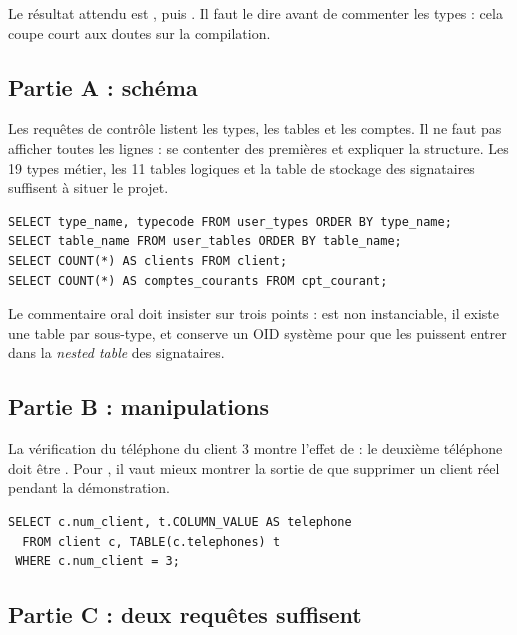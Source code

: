 Le résultat attendu est , puis . Il faut le dire avant
de commenter les types : cela coupe court aux doutes sur la compilation.

\subsection{Partie A : schéma}

Les requêtes de contrôle listent les types, les tables et les comptes. Il ne
faut pas afficher toutes les lignes : se contenter des premières et expliquer
la structure. Les 19 types métier, les 11 tables logiques et la table de
stockage des signataires suffisent à situer le projet.

\begin{lstlisting}[caption={Contrôle du schéma en démonstration.},label={lst:demo-schema}]
SELECT type_name, typecode FROM user_types ORDER BY type_name;
SELECT table_name FROM user_tables ORDER BY table_name;
SELECT COUNT(*) AS clients FROM client;
SELECT COUNT(*) AS comptes_courants FROM cpt_courant;
\end{lstlisting}

Le commentaire oral doit insister sur trois points :  est
non instanciable, il existe une table par sous-type, et  conserve
un OID système pour que les  puissent entrer dans la \emph{nested
table} des signataires.

\subsection{Partie B : manipulations}

La vérification du téléphone du client 3 montre l'effet de
 : le deuxième téléphone doit être
. Pour , il vaut mieux montrer la sortie
de  que supprimer un client réel pendant la démonstration.

\begin{lstlisting}[caption={Vérification du téléphone du client 3.},label={lst:demo-b5e}]
SELECT c.num_client, t.COLUMN_VALUE AS telephone
  FROM client c, TABLE(c.telephones) t
 WHERE c.num_client = 3;
\end{lstlisting}

\subsection{Partie C : deux requêtes suffisent}

